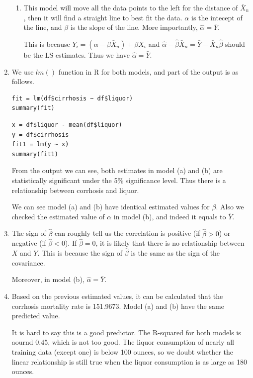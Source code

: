 \documentclass[11pt]{article}
\begin{document}
\begin{enumerate}
\begin{enumerate}
\item
This model will move all the data points to the left for the distance of $\bar{X}_n$, then it will find a straight line to best fit the data. $\alpha$ is the intecept of the line, and $\beta$ is the slope of the line. More importantly, $\hat{\alpha}=\bar{Y}$. \par
This is because $Y_i=(\alpha-\beta\bar{X}_n)+\beta X_i$
and $\hat{\alpha}-\hat{\beta}\bar{X}_n = \bar{Y} - \bar{X}_n \hat{\beta}$ should be the LS estimates. Thus we have $\hat{\alpha}=\bar{Y}$. 
\end{enumerate}

\item
We use $lm()$ function in R for both models, and part of the output is as follows. 
\begin{lstlisting}[frame=single]
fit = lm(df$cirrhosis ~ df$liquor)
summary(fit)
\end{lstlisting}


\begin{lstlisting}[frame=single]
x = df$liquor - mean(df$liquor)
y = df$cirrhosis
fit1 = lm(y ~ x)
summary(fit1)
\end{lstlisting}


From the output we can see, both estimates in model (a) and (b) are statistically significant under the 5\% significance level. Thus there is a relationship between corrhosis and liquor.  \par
We can see model (a) and (b) have identical estimated values for $\beta$. Also we checked the estimated value of $\alpha$ in model (b), and indeed it equals to $\bar{Y}$.

\item
The sign of $\hat{\beta}$ can roughly tell us the correlation is positive (if $\hat{\beta} > 0$) or negative (if $\hat{\beta} < 0$). If $\hat{\beta}=0$, it is likely that there is no relationship between $X$ and $Y$. This is because the sign of $\hat{\beta}$ is the same as the sign of the covariance. \par
Moreover, in model (b), $\hat{\alpha}=\bar{Y}$.

\item
Based on the previous estimated values, it can be calculated that the corrhosis mortality rate is 151.9673. Model (a) and (b) have the same predicted value. \par
It is hard to say this is a good predictor. The R-squared for both models is aournd 0.45, which is not too good. The liquor consumption of nearly all training data (except one) is below 100 ounces, so we doubt whether the linear relationship is still true when the liquor consumption is as large as 180 ounces.


\end{enumerate}
\end{document}
